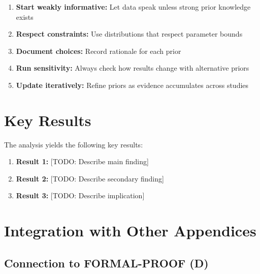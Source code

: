 \begin{tcolorbox}[colback=green!5!white, colframe=green!75!black,
    title=Best Practices for Prior Specification]
\begin{enumerate}
\item \textbf{Start weakly informative:} Let data speak unless strong prior knowledge exists
\item \textbf{Respect constraints:} Use distributions that respect parameter bounds
\item \textbf{Document choices:} Record rationale for each prior
\item \textbf{Run sensitivity:} Always check how results change with alternative priors
\item \textbf{Update iteratively:} Refine priors as evidence accumulates across studies
\end{enumerate}
\end{tcolorbox}



\section{Key Results}
\label{sec:results}

The analysis yields the following key results:

\begin{enumerate}
    \item \textbf{Result 1:} [TODO: Describe main finding]
    \item \textbf{Result 2:} [TODO: Describe secondary finding]
    \item \textbf{Result 3:} [TODO: Describe implication]
\end{enumerate}

\section{Integration with Other Appendices}
\label{sec:az-integration}

\subsection{Connection to FORMAL-PROOF (D)}

